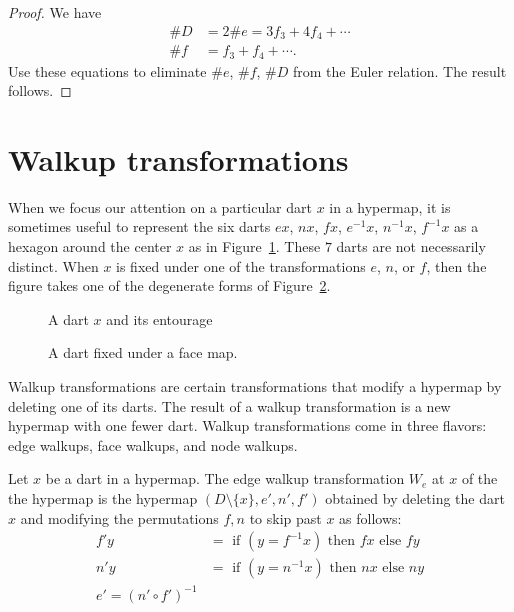 \begin{proof}  We have
    $$
    \begin{array}{lll}
     \# D &= 2 \# e = 3 f_3 + 4 f_4 + \cdots\\
    \# f &= f_3 + f_4 + \cdots.
    \end{array}
    $$
Use these equations to eliminate $\#e$, $\#f$, $\#D$ from the Euler
relation.  The result follows.
\end{proof}



\section{Walkup transformations}

When we focus our attention on a particular dart $x$ in a
hypermap, it is sometimes useful to represent the six darts $e x$,
$n x$, $f x$, $e^{-1} x$, $n^{-1} x$, $f^{-1} x$ as a hexagon
around the center $x$ as in Figure~\ref{fig:dart+}.  These $7$
darts are not necessarily distinct.   When $x$ is fixed under one
of the transformations $e$, $n$, or $f$, then the figure takes one
of the degenerate forms of Figure~\ref{fig:dart-fix}.

\begin{figure}[htb]
  \centering
  \caption{A dart $x$ and its entourage}
  \label{fig:dart+}
\end{figure}

\begin{figure}[htb]
  \centering
  \caption{A dart fixed under a face map.}
  \label{fig:dart-fix}
\end{figure}

Walkup transformations are certain transformations that modify a
hypermap by deleting one of its darts.  The result of a walkup
transformation is a new hypermap with one fewer dart.  Walkup
transformations come in three flavors: edge walkups, face walkups,
and node walkups.

\begin{definition}
Let $x$ be a dart in a hypermap.  The edge walkup transformation
$W_e$ at $x$ of the the hypermap is the hypermap
$(D\setminus\{x\},e',n',f')$ obtained by deleting the dart $x$ and
modifying the permutations $f,n$ to skip past $x$ as follows:
    $$
    \begin{array}{lll}
    f' y &= \text{ if } (y = f^{-1} x) \text{ then } f x \text{ else
    } f y\\
    n' y &= \text{ if } (y = n^{-1} x) \text{ then } n x \text{ else
    } n y\\
    e' = (n'\circ f')^{-1}
    \end{array}
    $$
\end{definition}

